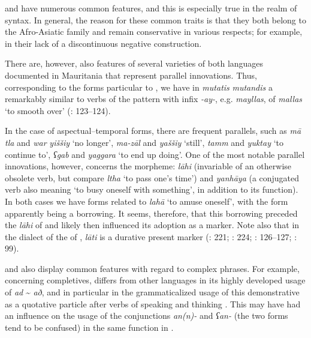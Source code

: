 \documentclass[output=paper]{langsci/langscibook}
\begin{document}
 and  have numerous common features, and this is especially true in the realm of syntax. In general, the reason for these common traits is that they both belong to the Afro-Asiatic family and remain conservative in various respects; for example, in their lack of a discontinuous negative construction.

There are, however, also features of several varieties of both languages documented in Mauritania that represent parallel innovations. Thus, corresponding to the  forms particular to , we have in  \textit{mutatis} \textit{mutandis} a remarkably similar  to verbs of the  pattern with infix \textit{-ay-}, e.g. \textit{mayllas},  of \textit{mallas} ‘to smooth over’ (\citealt{Taine-Cheikh2008chapter}: 123–124).

In the case of aspectual--temporal forms, there are frequent parallels, such as  \textit{mā} \textit{tla} and  \textit{war} \textit{yiššiy} ‘no longer’,  \textit{ma-zāl} and  \textit{yaššiy} ‘still’,  \textit{tamm} and  \textit{yuktay} ‘to continue to’,  \textit{ʕgab} and  \textit{yaggara} ‘to end up doing’. One of the most notable parallel innovations, however, concerns the  morpheme:  \textit{lāhi} (invariable  of an otherwise obsolete verb, but compare \textit{ltha} ‘to pass one’s time’) and  \textit{yanhāya} (a conjugated verb also meaning ‘to busy oneself with something’, in addition to its  function). In both cases we have forms related to   \textit{lahā} ‘to amuse oneself’, with the  form apparently being a borrowing. It seems, therefore, that this borrowing preceded the \textit{lāhi} of  and likely then influenced its adoption as a   marker. Note also that in the  dialect of the  of , \textit{lāti} is a durative present  marker (\citealt{Cohen1924}: 221; \citealt{Taine-Cheikh2004}: 224; \citealt{Taine-Cheikh2008chapter}: 126–127; \citealt{Taine-Cheikh2009}: 99).

 and  also display common features with regard to complex phrases. For example, concerning completives,  differs from other  languages in its highly developed usage of \textit{ad} \~{} \textit{að}, and in particular in the grammaticalized usage of this demonstrative as a quotative particle after verbs of speaking and thinking \citep{Taine-Cheikh2010Zenaga}. This may have had an influence on the usage of the conjunctions \textit{an(n)-} and \textit{ʕan-} (the two forms tend to be confused) in the same function in .
\end{document}
